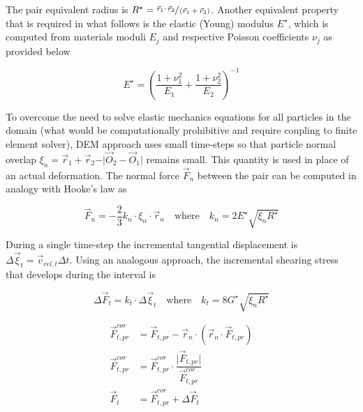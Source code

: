 The pair equivalent radius is $R^{\star}=\sfrac{\vec{r}_{1}\cdotp{}\vec{r}_{2}}{\left(\vec{r}_{1}+\vec{r}_{2}\right)}$. Another equivalent property that is required in what follows is the elastic (Young) modulus $E^{\star}$, which is computed from materials moduli $E_{j}$ and respective Poisson coefficients $\nu_{j}$ as provided below

\begin{equation}
E^{\star} = \left(\dfrac{1 + \nu_{1}^2}{E_{1}}+\dfrac{1 + \nu_{2}^2}{E_{2}}\right)^{-1}
\end{equation}

To overcome the need to solve elastic mechanics equations for all particles in the domain (what would be computationally prohibitive and require coupling to finite element solver), DEM approach uses small time-steps so that particle normal overlap $\xi_{n}=\vec{r}_{1}+\vec{r}_{2}-\vert\vec{O}_{2}-\vec{O}_{1}\vert$ remains small. This quantity is used in place of an actual deformation. The normal force $\vec{F}_{n}$ between the pair can be computed in analogy with Hooke's law as

\begin{equation}
\vec{F}_{n} = -\dfrac{2}{3}k_{n}\cdotp\xi_{n}\cdotp\vec{r}_{n}
\quad\text{where}\quad{}k_{n}=2{E}^{\star}\sqrt{\xi_{n}R^{\star}}
\end{equation}

During a single time-step the incremental tangential displacement is $\Delta\vec{\xi}_{t}=\vec{v}_{rel,t}\Delta{}t$. Using an analogous approach, the incremental shearing stress that develops during the interval is

\begin{equation}
\Delta\vec{F}_{t}=k_{t}\cdotp\Delta\vec{\xi}_{t}
\quad\text{where}\quad{}k_{t}=8{G}^{\star}\sqrt{{\xi}_{n}{R}^{\star}}
\end{equation}

\begin{equation}
\begin{aligned}
\vec{F}_{t,pr}^{cor} &= \vec{F}_{t,pr}-\vec{r}_n\cdotp\left(\vec{r}_n\cdotp\vec{F}_{t,pr}\right)\\[6pt]
\vec{F}_{t,pr}^{cor} &= \vec{F}_{t,pr}^{cor}\cdotp\dfrac{\vert\vec{F}_{t,pr}\vert}{\vec{F}_{t,pr}^{cor}}\\[6pt]
\vec{F}_{t}&=\vec{F}_{t,pr}^{cor}+\Delta\vec{F}_{t}
\end{aligned}
\end{equation}

